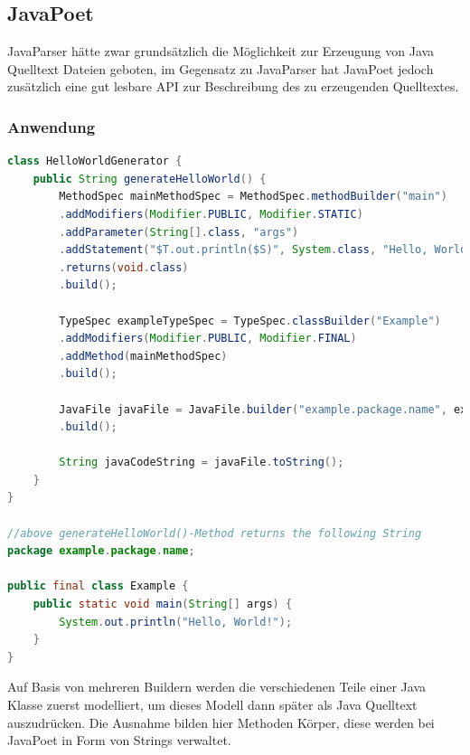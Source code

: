 \documentclass[12pt,oneside,a4paper,parskip]{scrbook}
\begin{document}
\subsection{JavaPoet}

JavaParser hätte zwar grundsätzlich die Möglichkeit zur Erzeugung von Java Quelltext Dateien geboten, im Gegensatz zu JavaParser hat JavaPoet jedoch zusätzlich eine gut lesbare API zur Beschreibung des zu erzeugenden Quelltextes.

\subsubsection{Anwendung}

\begin{lstlisting}[label=lst:jpoet,
language=java,
firstnumber=1,
caption={Java-Quelltext zur Erzeugung eines \glqq Hallo, Welt!\grqq -Beispiels, angelehnt an das \glqq Hello, JavaPoet!\grqq{} Beispiel in der README.md von\,\cite{javapoet2017}.}]
class HelloWorldGenerator {
	public String generateHelloWorld() {
		MethodSpec mainMethodSpec = MethodSpec.methodBuilder("main")
		.addModifiers(Modifier.PUBLIC, Modifier.STATIC)
		.addParameter(String[].class, "args")
		.addStatement("$T.out.println($S)", System.class, "Hello, World!")
		.returns(void.class)
		.build();
		
		TypeSpec exampleTypeSpec = TypeSpec.classBuilder("Example")
		.addModifiers(Modifier.PUBLIC, Modifier.FINAL)
		.addMethod(mainMethodSpec)
		.build();
		
		JavaFile javaFile = JavaFile.builder("example.package.name", exampleTypeSpec)
		.build();
		
		String javaCodeString = javaFile.toString();
	}
}

//above generateHelloWorld()-Method returns the following String
package example.package.name;

public final class Example {
	public static void main(String[] args) {
		System.out.println("Hello, World!");
	}
}

\end{lstlisting}

Auf Basis von mehreren Buildern werden die verschiedenen Teile einer Java Klasse zuerst modelliert, um dieses Modell dann später als Java Quelltext auszudrücken. Die Ausnahme bilden hier Methoden Körper, diese werden bei JavaPoet in Form von Strings verwaltet.
\end{document}

